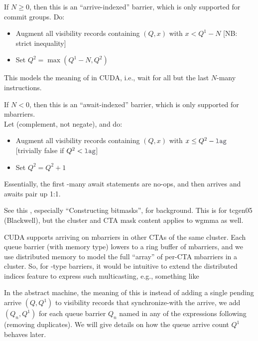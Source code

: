 \filbreak
If $N \geq 0$, then this is an ``arrive-indexed'' barrier, which is only supported for commit groups. Do:
\begin{itemize}
  \item Augment all visibility records containing $(Q, x)$ with $x < Q^1 - N$ [NB: strict inequality]
  \item Set $Q^2 = \max(Q^1 - N, Q^2)$
\end{itemize}
This models the meaning of  in CUDA, i.e., wait for all but the last $N$-many  instructions.

\filbreak
If $N < 0$, then this is an ``await-indexed'' barrier, which is only supported for mbarriers.\\
Let  (complement, not negate), and do:
\begin{itemize}
  \item Augment all visibility records containing $(Q, x)$ with $x \leq Q^2 - \lighttt{lag}$ [trivially false if $Q^2 < \lighttt{lag}$]
  \item Set $Q^2 = Q^2 + 1$
\end{itemize}
Essentially, the first -many await statements are no-ops, and then arrives and awaits pair up 1:1.

\newpage
{}
\label{ch:Multicasting}

See this , especially ``Constructing bitmasks'', for background.
This is for tcgen05 (Blackwell), but the cluster and CTA mask content applies to wgmma as well.

\filbreak
CUDA supports arriving on mbarriers in other CTAs of the same cluster.
Each queue barrier (with  memory type) lowers to a ring buffer of mbarriers, and we use distributed memory to model the full ``array'' of per-CTA mbarriers in a cluster.
So, for -type barriers, it would be intuitive to extend the distributed indices feature to express such multicasting, e.g., something like

\filbreak


\filbreak
In the abstract machine, the meaning of this is instead of adding a single pending arrive $(Q, Q^1)$ to visibility records that synchronize-with the arrive, we add $(Q_n, Q^1)$ for each queue barrier $Q_n$ named in any of the expressions following \lighttt{>>} (removing duplicates).
We will give details on how the queue arrive count $Q^1$ behaves later.

